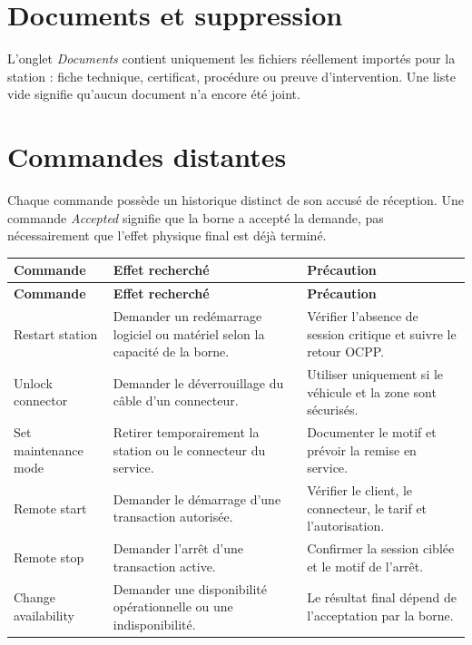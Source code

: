 \section{Documents et suppression}

L'onglet \emph{Documents} contient uniquement les fichiers réellement importés
pour la station : fiche technique, certificat, procédure ou preuve
d'intervention. Une liste vide signifie qu'aucun document n'a encore été
joint.


\section{Commandes distantes}

Chaque commande possède un historique distinct de son accusé de réception. Une
commande \emph{Accepted} signifie que la borne a accepté la demande, pas
nécessairement que l'effet physique final est déjà terminé.

\begingroup
\small
\renewcommand{\arraystretch}{1.05}
\begin{longtable}{|L{3.7cm}|L{5.2cm}|L{6.2cm}|}
  \hline
  \textbf{Commande} & \textbf{Effet recherché} & \textbf{Précaution} \\ \hline
  \endfirsthead
  \hline
  \textbf{Commande} & \textbf{Effet recherché} & \textbf{Précaution} \\ \hline
  \endhead
  Restart station &
  Demander un redémarrage logiciel ou matériel selon la capacité de la borne. &
  Vérifier l'absence de session critique et suivre le retour OCPP. \\ \hline
  Unlock connector &
  Demander le déverrouillage du câble d'un connecteur. &
  Utiliser uniquement si le véhicule et la zone sont sécurisés. \\ \hline
  Set maintenance mode &
  Retirer temporairement la station ou le connecteur du service. &
  Documenter le motif et prévoir la remise en service. \\ \hline
  Remote start &
  Demander le démarrage d'une transaction autorisée. &
  Vérifier le client, le connecteur, le tarif et l'autorisation. \\ \hline
  Remote stop &
  Demander l'arrêt d'une transaction active. &
  Confirmer la session ciblée et le motif de l'arrêt. \\ \hline
  Change availability &
  Demander une disponibilité opérationnelle ou une indisponibilité. &
  Le résultat final dépend de l'acceptation par la borne. \\ \hline
\end{longtable}
\endgroup

